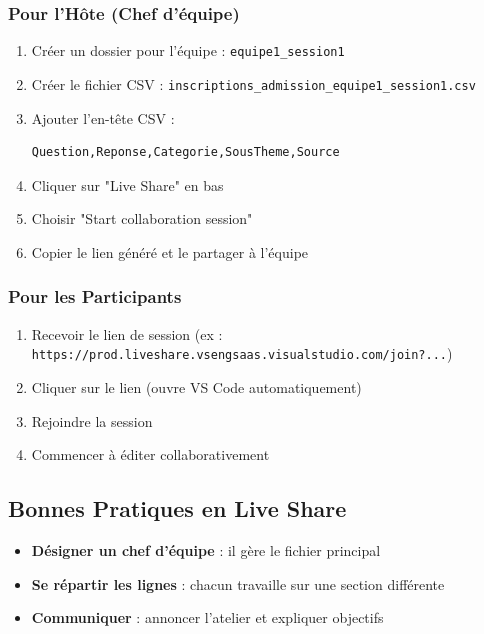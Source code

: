\documentclass[11pt,a4paper]{article}
\begin{document}
\subsubsection{Pour l'Hôte (Chef d'équipe)}
\begin{enumerate}
    \item Créer un dossier pour l'équipe : \texttt{equipe1\_session1}
    \item Créer le fichier CSV : \texttt{inscriptions\_admission\_equipe1\_session1.csv}
    \item Ajouter l'en-tête CSV :
    \begin{lstlisting}
Question,Reponse,Categorie,SousTheme,Source
    \end{lstlisting}
    \item Cliquer sur "Live Share" en bas
    \item Choisir "Start collaboration session"
    \item Copier le lien généré et le partager à l'équipe
\end{enumerate}

\subsubsection{Pour les Participants}
\begin{enumerate}
    \item Recevoir le lien de session (ex : \texttt{https://prod.liveshare.vsengsaas.visualstudio.com/join?...})
    \item Cliquer sur le lien (ouvre VS Code automatiquement)
    \item Rejoindre la session
    \item Commencer à éditer collaborativement
\end{enumerate}

\subsection{Bonnes Pratiques en Live Share}
\begin{astuce}
\begin{itemize}
    \item \textbf{Désigner un chef d'équipe} : il gère le fichier principal
    \item \textbf{Se répartir les lignes} : chacun travaille sur une section différente
    \item \textbf{Communiquer} : annoncer l'atelier et expliquer objectifs
\end{itemize}
\end{astuce}
\end{document}
